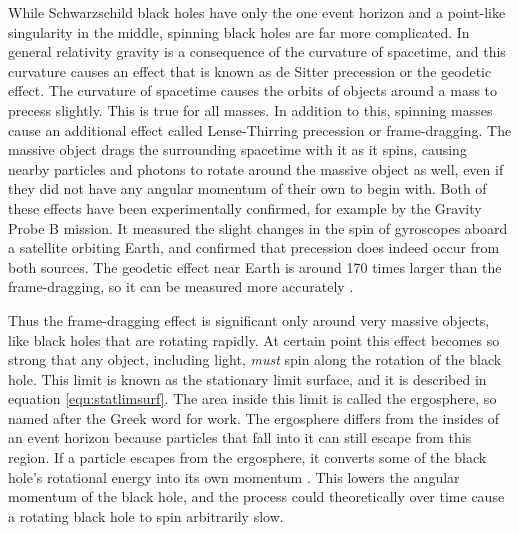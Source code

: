 \documentclass[english, oneside]{HYgradu}
\begin{document}
While Schwarzschild black holes have only the one event horizon and a point-like singularity in the middle, spinning black holes are far more complicated. In general relativity gravity is a consequence of the curvature of spacetime, and this curvature causes an effect that is known as de Sitter precession or the geodetic effect. The curvature of spacetime causes the orbits of objects around a mass to precess slightly. This is true for all masses. In addition to this, spinning masses cause an additional effect called Lense-Thirring precession or frame-dragging. The massive object drags the surrounding spacetime with it as it spins, causing nearby particles and photons to rotate around the massive object as well, even if they did not have any angular momentum of their own to begin with. Both of these effects have been experimentally confirmed, for example by the Gravity Probe B mission. It measured the slight changes in the spin of gyroscopes aboard a satellite orbiting Earth, and confirmed that precession does indeed occur from both sources. The geodetic effect near Earth is around 170 times larger than the frame-dragging, so it can be measured more accurately \citep{everitt:2009}.

Thus the frame-dragging effect is significant only around very massive objects, like black holes that are rotating rapidly. At certain point this effect becomes so strong that any object, including light, \textit{must} spin along the rotation of the black hole. This limit is known as the stationary limit surface, and it is described in equation \eqref{equ:statlimsurf}. The area inside this limit is called the ergosphere, so named after the Greek word for work. The ergosphere differs from the insides of an event horizon because particles that fall into it can still escape from this region. If a particle escapes from the ergosphere, it converts some of the black hole's rotational energy into its own momentum \citep{grintro}. This lowers the angular momentum of the black hole, and the process could theoretically over time cause a rotating black hole to spin arbitrarily slow.

\end{document}
